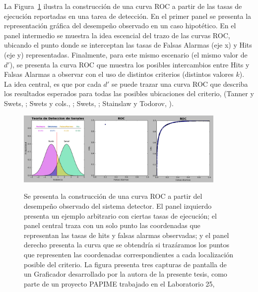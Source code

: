 La Figura~\ref{fig:Graf_ROC} ilustra la construcción de una curva ROC a partir de las tasas de ejecución reportadas en una tarea de detección. En el primer panel se presenta la representación gráfica del desempeño observado en un caso hipotético. En el panel intermedio se muestra la idea escencial del trazo de las curvas ROC, ubicando el punto donde se interceptan las tasas de Falsas Alarmas (eje x) y Hits (eje y) representadas. Finalmente, para este mismo escenario (el mismo valor de $d'$), se presenta la curva ROC que muestra los posibles intercambios entre Hits y Falsas Alarmas a observar con el uso de distintos criterios (distintos valores $k$). La idea central, es que por cada $d'$ se puede trazar una curva ROC que describa los resultados esperados para todas las posibles ubicaciones del criterio, (Tanner y Swets, \citeyear{Tanner1954}; Swets y cols.,  \citeyear{Swets1961}; Swets, \citeyear{Swets1973}; Stainslaw y Todorov, \citeyear{Stainslaw1999}).\\

\begin{figure}[th]
\centering
\includegraphics[width=0.90\textwidth]{Figures/Graficador_ROC12}\\
\caption[Ejemplo de Curva ROC]{Se presenta la construcción de una curva ROC a partir del desempeño observado del sistema detector. El panel izquierdo presenta un ejemplo arbitrario con ciertas tasas de ejecución; el panel central traza con un solo punto las coordenadas que representan las tasas de hits y falsas alarmas observadas; y el panel derecho presenta la curva que se obtendría si trazáramos los puntos que representen las coordenadas correspondientes a cada localización posible del criterio. La figura presenta tres capturas de pantalla de un Graficador desarrollado por la autora de la presente tesis, como parte de un proyecto PAPIME trabajado en el Laboratorio 25, \citep{PAPIME}}
\label{fig:Graf_ROC}
\end{figure}


